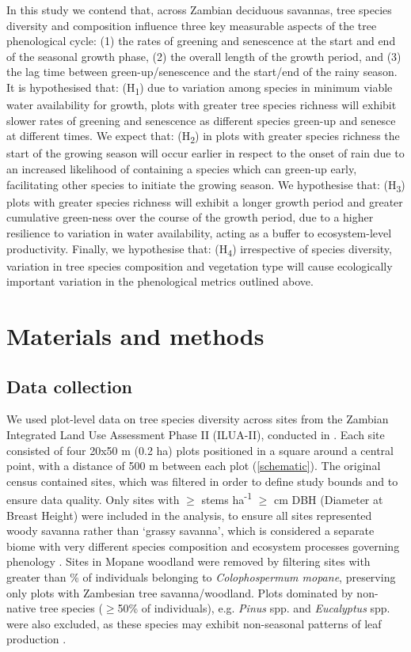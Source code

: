 \documentclass[11pt,a4paper]{article}
\begin{document}
In this study we contend that, across Zambian deciduous savannas, tree species diversity and composition influence three key measurable aspects of the tree phenological cycle: (1) the rates of greening and senescence at the start and end of the seasonal growth phase, (2) the overall length of the growth period, and (3) the lag time between green-up/senescence and the start/end of the rainy season. It is hypothesised that: (H\textsubscript{1}) due to variation among species in minimum viable water availability for growth, plots with greater tree species richness will exhibit slower rates of greening and senescence as different species green-up and senesce at different times. We expect that: (H\textsubscript{2}) in plots with greater species richness the start of the growing season will occur earlier in respect to the onset of rain due to an increased likelihood of containing a species which can green-up early, facilitating other species to initiate the growing season. We hypothesise that: (H\textsubscript{3}) plots with greater species richness will exhibit a longer growth period and greater cumulative green-ness over the course of the growth period, due to a higher resilience to variation in water availability, acting as a buffer to ecosystem-level productivity. Finally, we hypothesise that: (H\textsubscript{4}) irrespective of species diversity, variation in tree species composition and vegetation type will cause ecologically important variation in the phenological metrics outlined above. 

\section{Materials and methods}

\subsection{Data collection}

We used plot-level data on tree species diversity across \nSites{} sites from the Zambian Integrated Land Use Assessment Phase II (ILUA-II), conducted in \censusDate{} \citep{Mukosha2009, Pelletier2018}. Each site consisted of four 20x50 m (0.2 ha) plots positioned in a square around a central point, with a distance of 500 m between each plot (\autoref{schematic}). The original census contained \nTotalSites{} sites, which was filtered in order to define study bounds and to ensure data quality. Only sites with $\geq$\treesHa{} stems ha\textsuperscript{-1} $\geq$\stemSize{} cm DBH (Diameter at Breast Height) were included in the analysis, to ensure all sites represented woody savanna rather than `grassy savanna', which is considered a separate biome with very different species composition and ecosystem processes governing phenology \citep{Parr2014}. Sites in Mopane woodland were removed by filtering sites with greater than \mopanePer{}\% of individuals belonging to \textit{Colophospermum mopane}, preserving only plots with Zambesian tree savanna/woodland. Plots dominated by non-native tree species ($\geq$50\% of individuals), e.g. \textit{Pinus} spp. and \textit{Eucalyptus} spp. were also excluded, as these species may exhibit non-seasonal patterns of leaf production \citep{}.
\end{document}
